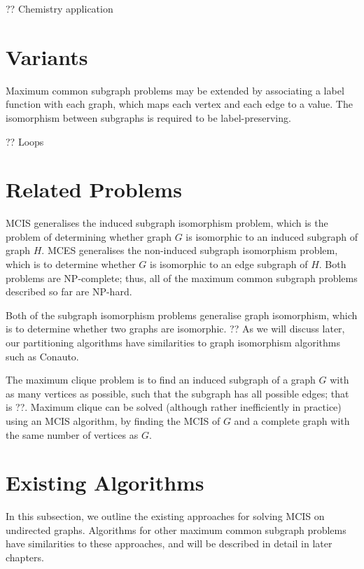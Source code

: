 ?? Chemistry application


\section{Variants}

Maximum common subgraph problems may be extended by associating a label
function with each graph, which maps each vertex and each edge to a value. The
isomorphism between subgraphs is required to be label-preserving.

?? Loops

\section{Related Problems}

MCIS generalises the induced subgraph isomorphism problem, which is the problem
of determining whether graph $G$ is isomorphic to an induced subgraph of graph $H$.
MCES generalises the non-induced subgraph isomorphism problem, which is to
determine whether $G$ is isomorphic to an edge subgraph of $H$. Both problems are
NP-complete; thus, all of the maximum common subgraph problems described so far
are NP-hard.

Both of the subgraph isomorphism problems generalise graph isomorphism, which
is to determine whether two graphs are isomorphic. ?? As we will discuss later,
our partitioning algorithms have similarities to graph isomorphism algorithms
such as Conauto.

The maximum clique problem is to find an induced subgraph of a graph $G$ with as
many vertices as possible, such that the subgraph has all possible edges; that
is ??. Maximum clique can be solved (although rather inefficiently in practice)
using an MCIS algorithm, by finding the MCIS of $G$ and a complete graph with the
same number of vertices as $G$.

\section{Existing Algorithms}

In this subsection, we outline the existing approaches for solving MCIS on
undirected graphs. Algorithms for other maximum common subgraph problems have
similarities to these approaches, and will be described in detail in later
chapters.

